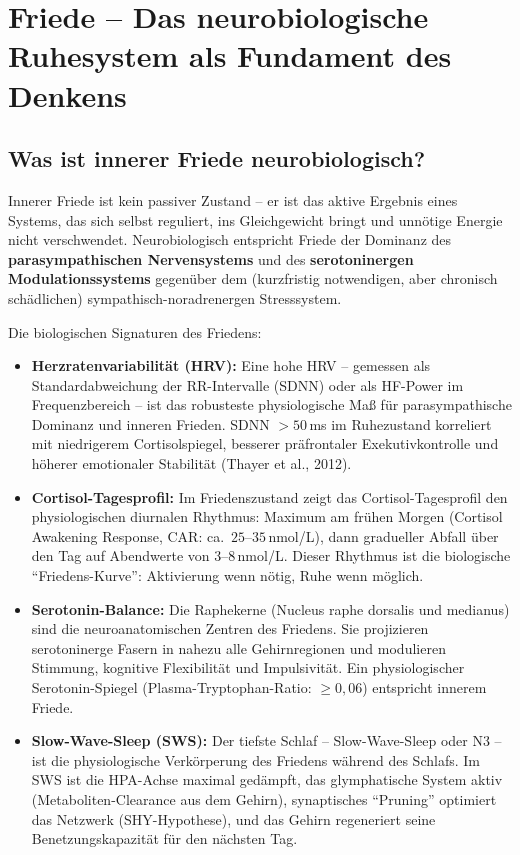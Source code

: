﻿\documentclass[12pt,a4paper]{report}
\theoremstyle{plain}
\theoremstyle{definition}
\theoremstyle{remark}
\begin{document}
	\section{Friede -- Das neurobiologische Ruhesystem als Fundament des Denkens}

	\subsection{Was ist innerer Friede neurobiologisch?}

	Innerer Friede ist kein passiver Zustand -- er ist das aktive Ergebnis
	eines Systems, das sich selbst reguliert, ins Gleichgewicht bringt
	und unnötige Energie nicht verschwendet.
	Neurobiologisch entspricht Friede der Dominanz des
	\textbf{parasympathischen Nervensystems} und des
	\textbf{serotoninergen Modulationssystems} gegenüber dem
	(kurzfristig notwendigen, aber chronisch schädlichen)
	sympathisch-noradrenergen Stresssystem.

	Die biologischen Signaturen des Friedens:
	\begin{itemize}
		\item \textbf{Herzratenvariabilität (HRV):}
		Eine hohe HRV -- gemessen als Standardabweichung der
		RR-Intervalle (SDNN) oder als HF-Power im Frequenzbereich --
		ist das robusteste physiologische Maß für parasympathische
		Dominanz und inneren Frieden. SDNN $> 50$\,ms im Ruhezustand
		korreliert mit niedrigerem Cortisolspiegel, besserer
		präfrontaler Exekutivkontrolle und höherer emotionaler
		Stabilität (Thayer et al., 2012).
		\item \textbf{Cortisol-Tagesprofil:}
		Im Friedenszustand zeigt das Cortisol-Tagesprofil den
		physiologischen diurnalen Rhythmus: Maximum am frühen Morgen
		(Cortisol Awakening Response, CAR: ca.\ $25$--$35$\,nmol/L),
		dann gradueller Abfall über den Tag auf Abendwerte von
		$3$--$8$\,nmol/L. Dieser Rhythmus ist die biologische
		``Friedens-Kurve'': Aktivierung wenn nötig, Ruhe wenn möglich.
		\item \textbf{Serotonin-Balance:}
		Die Raphekerne (Nucleus raphe dorsalis und medianus) sind
		die neuroanatomischen Zentren des Friedens.
		Sie projizieren serotoninerge Fasern in nahezu alle
		Gehirnregionen und modulieren Stimmung, kognitive Flexibilität
		und Impulsivität. Ein physiologischer Serotonin-Spiegel
		(Plasma-Tryptophan-Ratio: $\geq 0{,}06$) entspricht innerem Friede.
		\item \textbf{Slow-Wave-Sleep (SWS):}
		Der tiefste Schlaf -- Slow-Wave-Sleep oder N3 -- ist die
		physiologische Verkörperung des Friedens während des Schlafs.
		Im SWS ist die HPA-Achse maximal gedämpft, das glymphatische
		System aktiv (Metaboliten-Clearance aus dem Gehirn),
		synaptisches ``Pruning'' optimiert das Netzwerk (SHY-Hypothese),
		und das Gehirn regeneriert seine Benetzungskapazität für den
		nächsten Tag.
	\end{itemize}
\end{document}
